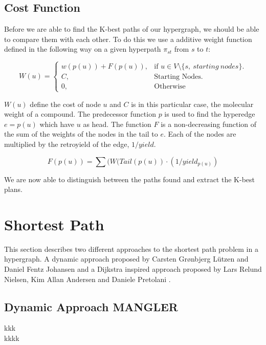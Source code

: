 \documentclass[a4paper,10pt,titlepage]{paper}
\begin{document}
\subsection{Cost Function}
Before we are able to find the K-best paths of our hypergraph, we should be able to compare them with each other. To do this we use a additive weight function defined in the following way on a given hyperpath $\pi_{st}$ from $s$ to $t$:

\begin{equation}
W(u)=\begin{cases}
    w(p(u)) + F(p(u)), & \text{if $u\in V\setminus \{s,\ starting\ nodes\}$}.\\
    C, & \text{Starting Nodes}. \\
    0, & \text{Otherwise}
  \end{cases}
\end{equation}

$W(u)$ define the cost of node $u$ and $C$ is in this particular case, the molecular weight of a compound. The predecessor function $p$ is used to find the hyperedge $e=p(u)$ which have $u$ as head. The function $F$ is a non-decreasing function of the sum of the weights of the nodes in the tail to $e$. Each of the nodes are multiplied by the retroyield of the edge, $1/yield$.

\begin{equation}
F(p(u)) = \sum(W(Tail(p(u)) \cdot (1/yield_{p(u)})
\end{equation}

We are now able to distinguish between the paths found and extract the K-best plans. \cite{Carsten}

\section{Shortest Path}
This section describes two different approaches to the shortest path problem in a hypergraph. A dynamic approach proposed by Carsten Grønbjerg Lützen and Daniel Fentz Johansen \cite{Carsten} and a Dijkstra inspired approach proposed by Lars Relund Nielsen, Kim Allan Andersen and Daniele Pretolani \cite{Nielsen}. 

\subsection{Dynamic Approach MANGLER}
kkk \cite{Carsten}\\
kkkk \cite{Fagerberg}\\
\end{document}
